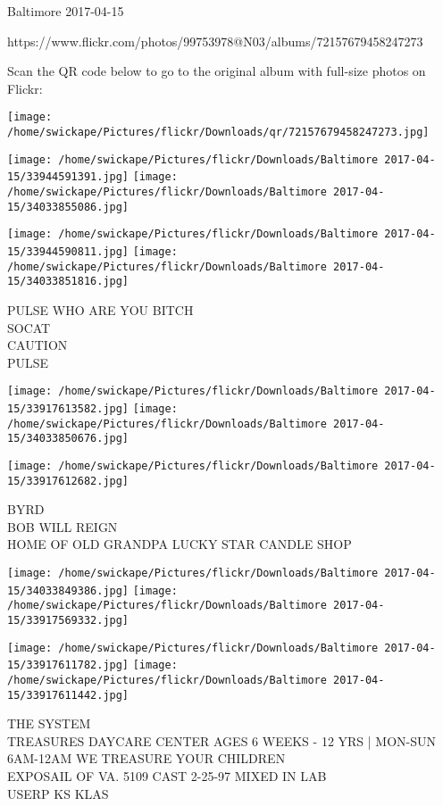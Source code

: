 \documentclass[10pt,letterpaper]{article}
\begin{document}
Baltimore 2017-04-15

https://www.flickr.com/photos/99753978@N03/albums/72157679458247273

Scan the QR code below to go to the original album with full-size photos on Flickr:

\texttt{[image: /home/swickape/Pictures/flickr/Downloads/qr/72157679458247273.jpg]}
\pagebreak

\texttt{[image: /home/swickape/Pictures/flickr/Downloads/Baltimore 2017-04-15/33944591391.jpg]}
\texttt{[image: /home/swickape/Pictures/flickr/Downloads/Baltimore 2017-04-15/34033855086.jpg]}

\texttt{[image: /home/swickape/Pictures/flickr/Downloads/Baltimore 2017-04-15/33944590811.jpg]}
\texttt{[image: /home/swickape/Pictures/flickr/Downloads/Baltimore 2017-04-15/34033851816.jpg]}

PULSE WHO ARE YOU BITCH\\
SOCAT\\
CAUTION\\
PULSE
\pagebreak

\texttt{[image: /home/swickape/Pictures/flickr/Downloads/Baltimore 2017-04-15/33917613582.jpg]}
\texttt{[image: /home/swickape/Pictures/flickr/Downloads/Baltimore 2017-04-15/34033850676.jpg]}

\vspace{0.25in}
\texttt{[image: /home/swickape/Pictures/flickr/Downloads/Baltimore 2017-04-15/33917612682.jpg]}

BYRD\\
BOB WILL REIGN\\
HOME OF OLD GRANDPA LUCKY STAR CANDLE SHOP
\pagebreak

\texttt{[image: /home/swickape/Pictures/flickr/Downloads/Baltimore 2017-04-15/34033849386.jpg]}
\texttt{[image: /home/swickape/Pictures/flickr/Downloads/Baltimore 2017-04-15/33917569332.jpg]}

\texttt{[image: /home/swickape/Pictures/flickr/Downloads/Baltimore 2017-04-15/33917611782.jpg]}
\texttt{[image: /home/swickape/Pictures/flickr/Downloads/Baltimore 2017-04-15/33917611442.jpg]}

THE SYSTEM\\
TREASURES DAYCARE CENTER AGES 6 WEEKS {-} 12 YRS | MON{-}SUN 6AM{-}12AM WE TREASURE YOUR CHILDREN\\
EXPOSAIL OF VA. 5109 CAST 2{-}25{-}97 MIXED IN LAB\\
USERP KS KLAS
\pagebreak
\end{document}
